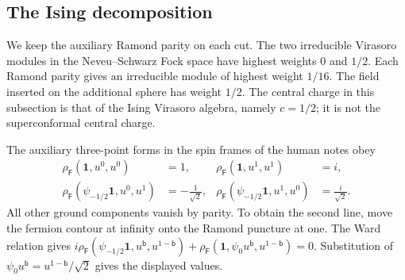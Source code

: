 \subsection{The Ising decomposition}

We keep the auxiliary Ramond parity on each cut.  The two irreducible
Virasoro modules in the Neveu--Schwarz Fock space have highest weights
$0$ and $1/2$.  Each Ramond parity gives an irreducible module of highest
weight $1/16$.  The field inserted on the additional sphere has weight
$1/2$.  The central charge in this subsection is that of the Ising
Virasoro algebra, namely $c=1/2$; it is not the superconformal central
charge.

The auxiliary three-point forms in the spin frames of the human notes
obey
\begin{align}
 \rho_{\mathsf F}(\mathbf1,u^0,u^0)&=1,&
 \rho_{\mathsf F}(\mathbf1,u^1,u^1)&=i,\\
 \rho_{\mathsf F}(\psi_{-1/2}\mathbf1,u^0,u^1)&=-\frac1{\sqrt2},&
 \rho_{\mathsf F}(\psi_{-1/2}\mathbf1,u^1,u^0)&=\frac{i}{\sqrt2}.
\end{align}
All other ground components vanish by parity.  To obtain the second
line, move the fermion contour at infinity onto the Ramond puncture at
one.  The Ward relation gives $i\rho_{\mathsf F}
(\psi_{-1/2}\mathbf1,u^{\mathsf b},u^{1-\mathsf b})+
\rho_{\mathsf F}(\mathbf1,\psi_0u^{\mathsf b},u^{1-\mathsf b})=0$.
Substitution of $\psi_0u^{\mathsf b}=u^{1-\mathsf b}/\sqrt2$ gives
the displayed values.

